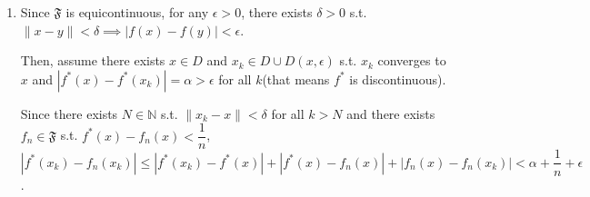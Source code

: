 \documentclass[12pt]{article}
\begin{document}
\begin{enumerate}
    \item Since $\mathfrak{F}$ is equicontinuous, for any $\epsilon > 0$, there exists $\delta > 0$ s.t. $\| x-y\| < \delta \implies |f(x) - f(y)| < \epsilon$.
    
    Then, assume there exists $x \in D$ and  $x_k\in D\cup D(x, \epsilon)$ s.t. $x_k$ converges to $x$ and $|f^*(x) - f^*(x_k)| = \alpha > \epsilon$ for all $k$(that means $f^*$ is discontinuous).

    Since there exists $N\in \mathbb{N}$ s.t. $\| x_k - x\| < \delta$ for all $k > N$ and 
    there exists $f_n\in \mathfrak{F}$ s.t. $f^*(x) - f_n(x) < \dfrac{1}{n}$,
    $|f^*(x_k) - f_n(x_k)| \leq |f^*(x_k) - f^*(x)| + |f^*(x) - f_n(x)| + |f_n(x) - f_n(x_k)| < \alpha + \dfrac{1}{n} + \epsilon$.

\end{enumerate}
\end{document}
